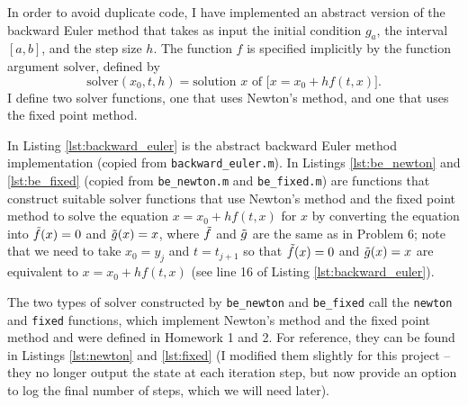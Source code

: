 \documentclass{homework}
\begin{document}
	\question
	\begin{alphaparts}
		\questionpart
		\newcommand{\solver}{\mathrm{solver}}
		In order to avoid duplicate code, I have implemented an abstract version of the backward Euler method that takes as input the initial condition $g_a$, the interval $[a,b]$, and the step size $h$. The function $f$ is specified implicitly by the function argument $\solver$, defined by
		\begin{equation}
			\solver(x_0, t, h) = \text{solution $x$ of } \big[x = x_0 + hf(t,x)\big].
		\end{equation}
		I define two solver functions, one that uses Newton's method, and one that uses the fixed point method. 
		
		In Listing \ref{lst:backward_euler} is the abstract backward Euler method implementation (copied from \verb*|backward_euler.m|). In Listings \ref{lst:be_newton} and \ref{lst:be_fixed} (copied from \verb*|be_newton.m| and \verb*|be_fixed.m|) are functions that construct suitable $\solver$ functions that use Newton's method and the fixed point method to solve the equation $x = x_0 + hf(t,x)$ for $x$ by converting the equation into $\tilde{f}(x) = 0$ and $\tilde{g}(x) = x$, where $\tilde{f}$ and $\tilde{g}$ are the same as in Problem 6; note that we need to take $x_0 = y_j$ and $t = t_{j+1}$ so that $\tilde{f}(x) = 0$ and $\tilde{g}(x) = x$ are equivalent to $x = x_0 + hf(t,x)$ (see line 16 of Listing \ref{lst:backward_euler}).
		
		
		
		
		
		
		
		The two types of $\solver$ constructed by \verb*|be_newton| and \verb*|be_fixed| call the \verb*|newton| and \verb*|fixed| functions, which implement Newton's method and the fixed point method and were defined in Homework 1 and 2. For reference, they can be found in Listings \ref{lst:newton} and \ref{lst:fixed} (I modified them slightly for this project -- they no longer output the state at each iteration step, but now provide an option to log the final number of steps, which we will need later).
		
		
		
	\end{alphaparts}
\end{document}
